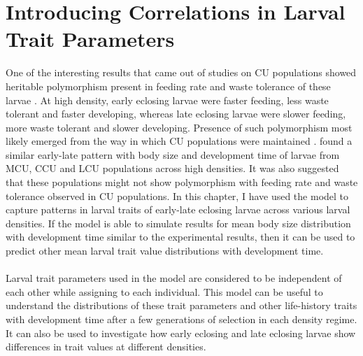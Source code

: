 \chapter{Introducing Correlations in Larval Trait Parameters}
One of the interesting results that came out of studies on CU populations showed heritable polymorphism present in feeding rate and waste tolerance of these larvae \citep{borashGeneticPolymorphismMaintained1998}. At high density, early eclosing larvae were faster feeding, less waste tolerant and faster developing, whereas late eclosing larvae were slower feeding, more waste tolerant and slower developing. Presence of such polymorphism most likely emerged from the way in which CU populations were maintained \citep{archanaGeneticArchitectureFitnessrelated2009}. \citet{sarangiEcologicalDetailsMediate2018} found a similar early-late pattern with body size and development time of larvae from MCU, CCU and LCU populations across high densities. It was also suggested that these populations might not show polymorphism with feeding rate and waste tolerance observed in CU populations. In this chapter, I have used the model to capture patterns in larval traits of early-late eclosing larvae across various larval densities. If the model is able to simulate results for mean body size distribution with development time similar to the experimental results, then it can be used to predict other mean larval trait value distributions with development time. \\\\
Larval trait parameters used in the model are considered to be independent of each other while assigning to each individual. This model can be useful to understand the distributions of these trait parameters and other life-history traits with development time after a few generations of selection in each density regime. It can also be used to investigate how early eclosing and late eclosing larvae show differences in trait values at different densities.
